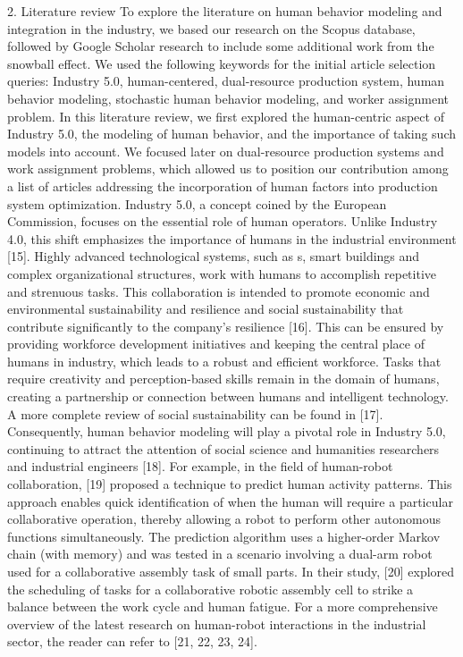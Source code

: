 2.	Literature review
To explore the literature on human behavior modeling and integration in the industry, we based our research on the Scopus database, followed by Google Scholar research to include some additional work from the snowball effect. We used the following keywords for the initial article selection queries: Industry 5.0, human-centered, dual-resource production system, human behavior modeling, stochastic human behavior modeling, and worker assignment problem. In this literature review, we first explored the human-centric aspect of Industry 5.0, the modeling of human behavior, and the importance of taking such models into account. We focused later on dual-resource production systems and work assignment problems, which allowed us to position our contribution among a list of articles addressing the incorporation of human factors into production system optimization.
Industry 5.0, a concept coined by the European Commission, focuses on the essential role of human operators. Unlike Industry 4.0, this shift emphasizes the importance of humans in the industrial environment [15]. Highly advanced technological systems, such as s, smart buildings and complex organizational structures, work with humans to accomplish repetitive and strenuous tasks. This collaboration is intended to promote economic and environmental sustainability and resilience and social sustainability that contribute significantly to the company’s resilience [16]. This can be ensured by providing workforce development initiatives and keeping the central place of humans in industry, which leads to a robust and efficient workforce. Tasks that require creativity and perception-based skills remain in the domain of humans, creating a partnership or connection between humans and intelligent technology. A more complete review of social sustainability can be found in [17].
Consequently, human behavior modeling will play a pivotal role in Industry 5.0, continuing to attract the attention of social science and humanities researchers and industrial engineers [18]. For example, in the field of human-robot collaboration, [19] proposed a technique to predict human activity patterns. This approach enables quick identification of when the human will require a particular collaborative operation, thereby allowing a robot to perform other autonomous functions simultaneously. The prediction algorithm uses a higher-order Markov chain (with memory) and was tested in a scenario involving a dual-arm robot used for a collaborative assembly task of small parts. In their study, [20] explored the scheduling of tasks for a collaborative robotic assembly cell to strike a balance between the work cycle and human fatigue. For a more comprehensive overview of the latest research on human-robot interactions in the industrial sector, the reader can refer to [21, 22, 23, 24].

